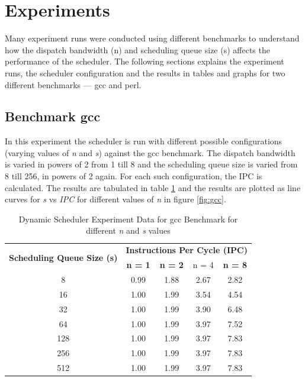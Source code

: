 \section{Experiments}
Many experiment runs were conducted using different benchmarks to understand how the dispatch bandwidth (n) and scheduling queue size (s) affects the performance of the scheduler. The following sections explains the experiment runs, the scheduler configuration and the results in tables and graphs for two different benchmarks --- gcc and perl.


\subsection{Benchmark gcc}
In this experiment the scheduler is run with different possible configurations (varying values of \textit{n} and \textit{s}) against the gcc benchmark. The dispatch bandwidth is varied in powers of 2 from 1 till 8 and the scheduling queue size is varied from 8 till 256, in powers of 2 again. For each such configuration, the IPC is calculated. The results are tabulated in table \ref{tab:gcc} and the results are plotted as line curves for \textit{s} vs \textit{IPC} for different values of \textit{n} in figure \ref{fig:gcc}.

\begin{table}[htbp]
    \centering
    \noindent \begin{tabular}{|c|c|c|c|c|}
        \hline
        \multirow{2}[4]{*}{\bf Scheduling Queue Size (s) } & \multicolumn{4}{c|}{\bf Instructions Per Cycle (IPC)} \\
        \cline{2-5} & \bf n = 1 & \bf n = 2 & n = 4 & \bf n = 8 \\
        \hline
          8 & 0.99 & 1.88 & 2.67 & 2.82 \\
         16 & 1.00 & 1.99 & 3.54 & 4.54 \\
         32 & 1.00 & 1.99 & 3.90 & 6.48 \\
         64 & 1.00 & 1.99 & 3.97 & 7.52 \\
        128 & 1.00 & 1.99 & 3.97 & 7.83 \\
        256 & 1.00 & 1.99 & 3.97 & 7.83 \\
        512 & 1.00 & 1.99 & 3.97 & 7.83 \\
        \hline
    \end{tabular}
    \captionsetup{justification=centering}
    \caption{Dynamic Scheduler Experiment Data for gcc Benchmark for different \textit{n} and \textit{s} values}
    \label{tab:gcc}
\end{table}


